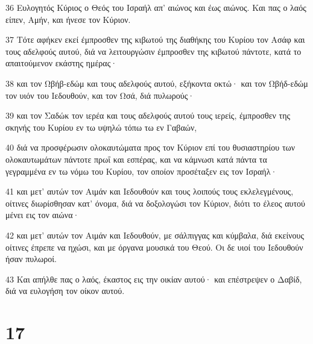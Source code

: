 \par 36 Ευλογητός Κύριος ο Θεός του Ισραήλ απ' αιώνος και έως αιώνος. Και πας ο λαός είπεν, Αμήν, και ήνεσε τον Κύριον.
\par 37 Τότε αφήκεν εκεί έμπροσθεν της κιβωτού της διαθήκης του Κυρίου τον Ασάφ και τους αδελφούς αυτού, διά να λειτουργώσιν έμπροσθεν της κιβωτού πάντοτε, κατά το απαιτούμενον εκάστης ημέρας·
\par 38 και τον Ωβήβ-εδώμ και τους αδελφούς αυτού, εξήκοντα οκτώ· και τον Ωβήδ-εδώμ τον υιόν του Ιεδουθούν, και τον Ωσά, διά πυλωρούς·
\par 39 και τον Σαδώκ τον ιερέα και τους αδελφούς αυτού τους ιερείς, έμπροσθεν της σκηνής του Κυρίου εν τω υψηλώ τόπω τω εν Γαβαών,
\par 40 διά να προσφέρωσιν ολοκαυτώματα προς τον Κύριον επί του θυσιαστηρίου των ολοκαυτωμάτων πάντοτε πρωΐ και εσπέρας, και να κάμνωσι κατά πάντα τα γεγραμμένα εν τω νόμω του Κυρίου, τον οποίον προσέταξεν εις τον Ισραήλ·
\par 41 και μετ' αυτών τον Αιμάν και Ιεδουθούν και τους λοιπούς τους εκλελεγμένους, οίτινες διωρίσθησαν κατ' όνομα, διά να δοξολογώσι τον Κύριον, διότι το έλεος αυτού μένει εις τον αιώνα·
\par 42 και μετ' αυτών τον Αιμάν και Ιεδουθούν, με σάλπιγγας και κύμβαλα, διά εκείνους οίτινες έπρεπε να ηχώσι, και με όργανα μουσικά του Θεού. Οι δε υιοί του Ιεδουθούν ήσαν πυλωροί.
\par 43 Και απήλθε πας ο λαός, έκαστος εις την οικίαν αυτού· και επέστρεψεν ο Δαβίδ, διά να ευλογήση τον οίκον αυτού.

\chapter{17}


